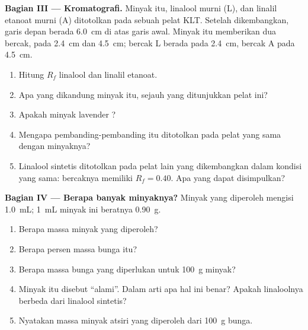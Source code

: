 \begin{problem}
\medskip
\noindent\textbf{Bagian III --- Kromatografi.}
Minyak itu, linalool murni (L), dan linalil etanoat murni (A) ditotolkan
pada sebuah pelat KLT. Setelah dikembangkan, garis depan berada
\qty{6.0}{cm} di atas garis awal. Minyak itu memberikan dua bercak, pada
\qty{2.4}{cm} dan \qty{4.5}{cm}; bercak L berada pada \qty{2.4}{cm},
bercak A pada \qty{4.5}{cm}.
\begin{enumerate}[resume]
  \item Hitung $R_f$ linalool dan linalil etanoat.
  \item Apa yang dikandung minyak itu, sejauh yang ditunjukkan pelat ini?
  \item Apakah minyak lavender ?
  \item Mengapa pembanding-pembanding itu ditotolkan pada pelat yang sama
        dengan minyaknya?
  \item Linalool sintetis ditotolkan pada pelat lain yang dikembangkan
        dalam kondisi yang sama: bercaknya memiliki $R_f = 0.40$. Apa yang
        dapat disimpulkan?
\end{enumerate}

\medskip
\noindent\textbf{Bagian IV --- Berapa banyak minyaknya?}
Minyak yang diperoleh mengisi \qty{1.0}{mL}; \qty{1}{mL} minyak ini
beratnya \qty{0.90}{g}.
\begin{enumerate}[resume]
  \item Berapa massa minyak yang diperoleh?
  \item Berapa persen massa bunga itu?
  \item Berapa massa bunga yang diperlukan untuk \qty{100}{g} minyak?
  \item Minyak itu disebut ``alami''. Dalam arti apa hal ini benar?
        Apakah linaloolnya berbeda dari linalool sintetis?
  \item Nyatakan massa minyak atsiri yang diperoleh dari \qty{100}{g}
        bunga.
\end{enumerate}
\end{problem}
